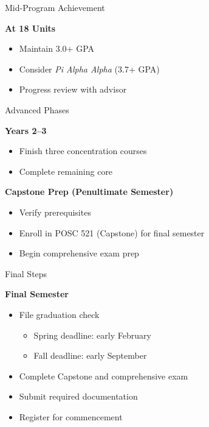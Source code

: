 \documentclass[10pt]{beamer}
\begin{document}
\begin{frame}{Mid-Program Achievement}
\begin{Large}
\textbf{At 18 Units}
\begin{itemize}
  \item Maintain 3.0+ GPA
  \item Consider \emph{Pi Alpha Alpha} (3.7+ GPA)
  \item Progress review with advisor
\end{itemize}
\end{Large}
\end{frame}

\begin{frame}{Advanced Phases}
\begin{Large}
\textbf{Years 2--3}
\begin{itemize}
  \item Finish three concentration courses
  \item Complete remaining core
\end{itemize}
\textbf{Capstone Prep (Penultimate Semester)}
\begin{itemize}
  \item Verify prerequisites
  \item Enroll in POSC 521 (Capstone) for final semester
  \item Begin comprehensive exam prep
\end{itemize}
\end{Large}
\end{frame}

\begin{frame}{Final Steps}
\begin{Large}
\textbf{Final Semester}
\begin{itemize}
  \item File graduation check
    \begin{itemize}
      \item Spring deadline: early February
      \item Fall deadline: early September
    \end{itemize}
  \item Complete Capstone and comprehensive exam
  \item Submit required documentation
  \item Register for commencement
\end{itemize}
\end{Large}
\end{frame}
\end{document}
